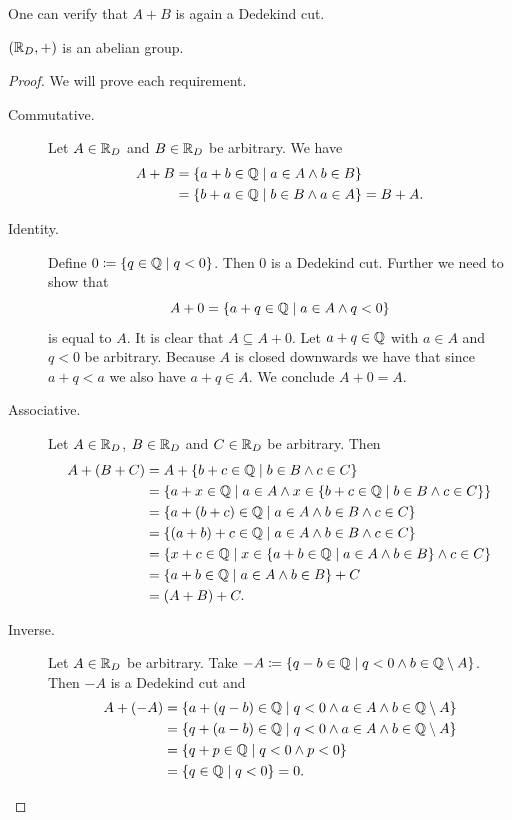 \documentclass[../main.tex]{subfiles}
\begin{document}
One can verify that $A+B$ is again a Dedekind cut.
\begin{proposition}\label{prp:the_real_numbers:dedekind_abelian_group_real_numbers}
    $(\mathbb{R}_D,+)$ is an abelian group.
\end{proposition}
\begin{proof}
    We will prove each requirement.
    \begin{description}
        \item[Commutative.] Let $A\in\mathbb{R}_D$ and $B\in\mathbb{R}_D$ be arbitrary. We have
        \begin{align*}
            A+B & =\{a+b\in\mathbb{Q}\mid a\in A\land b\in B\} \\
            & =\{b+a\in\mathbb{Q}\mid b\in B\land a\in A\}=B+A.
        \end{align*}
        \item[Identity.] Define $0\coloneq\{q\in\mathbb{Q}\mid q<0\}$. Then $0$ is a Dedekind cut. Further we need to show that
        \begin{equation*}
            A+0=\{a+q\in\mathbb{Q}\mid a\in A\land q<0\}
        \end{equation*}
        is equal to $A$. It is clear that $A\subseteq A+0$. Let $a+q\in\mathbb{Q}$ with $a\in A$ and $q<0$ be arbitrary. Because $A$ is closed downwards we have that since $a+q<a$ we also have $a+q\in A$. We conclude $A+0=A$.
        \item[Associative.] Let $A\in\mathbb{R}_D$, $B\in\mathbb{R}_D$ and $C\in\mathbb{R}_D$ be arbitrary. Then
        \begin{align*}
            A+(B+C) & =A+\{b+c\in\mathbb{Q}\mid b\in B\land c\in C\} \\
            & =\{a+x\in\mathbb{Q}\mid a\in A\land x\in\{b+c\in\mathbb{Q}\mid b\in B\land c\in C\}\} \\
            & =\{a+(b+c)\in\mathbb{Q}\mid a\in A\land b\in B\land c\in C\} \\
            & =\{(a+b)+c\in\mathbb{Q}\mid a\in A\land b\in B\land c\in C\} \\
            & =\{x+c\in\mathbb{Q}\mid x\in\{a+b\in\mathbb{Q}\mid a\in A\land b\in B\}\land c\in C\} \\
            & =\{a+b\in\mathbb{Q}\mid a\in A\land b\in B\}+C \\
            & =(A+B)+C.
        \end{align*}
        \item[Inverse.] Let $A\in\mathbb{R}_D$ be arbitrary. Take $-A\coloneq\{q-b\in\mathbb{Q}\mid q<0\land b\in\mathbb{Q}\setminus A\}$. Then $-A$ is a Dedekind cut and
        \begin{align*}
            A+(-A) & =\{a+(q-b)\in\mathbb{Q}\mid q<0\land a\in A\land b\in\mathbb{Q}\setminus A\} \\
            & =\{q+(a-b)\in\mathbb{Q}\mid q<0\land a\in A\land b\in\mathbb{Q}\setminus A\} \\
            & =\{q+p\in\mathbb{Q}\mid q<0\land p<0\} \\
            & =\{q\in\mathbb{Q}\mid q<0\}=0.
        \end{align*}
    \end{description}
\end{proof}
\end{document}
